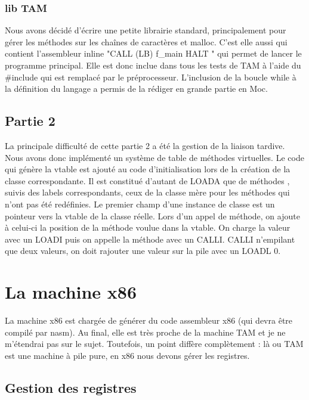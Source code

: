 \documentclass{scrartcl}
\begin{document}
\subsubsection{lib TAM}

Nous avons décidé d'écrire une petite librairie standard, principalement pour gérer les méthodes sur les
chaînes de caractères et malloc. C'est elle aussi qui contient l'assembleur inline "CALL (LB) f\_main
    HALT " qui permet de lancer le programme principal. Elle est donc inclue dans tous les tests de TAM à l'aide du \#include qui est remplacé par le préprocesseur.
L'inclusion de la boucle while à la définition du langage a permis de la rédiger en grande partie en Moc.

\subsection{Partie 2}

La principale difficulté de cette partie 2 a été la gestion de la liaison tardive.
Nous avons donc implémenté un système de table de méthodes virtuelles.
Le code qui génère la vtable est ajouté au code d'initialisation lors de la création de la classe correspondante.
Il est constitué d'autant de LOADA que de méthodes , suivis des labels correspondants, ceux de la classe mère pour 
les méthodes qui n'ont pas été redéfinies. Le premier champ d'une instance de classe est un pointeur vers la vtable de la classe réelle.
Lors d'un appel de méthode, on ajoute à celui-ci la position de la méthode voulue dans la vtable.
On charge la valeur avec un LOADI puis on appelle la méthode avec un CALLI.
CALLI n'empilant que deux valeurs, on doit rajouter une valeur sur la pile avec un LOADL 0.



\section{La machine x86}

La machine x86 est chargée de générer du code assembleur x86 (qui devra être compilé par nasm).
Au final, elle est très proche de la machine TAM et je ne m'étendrai pas sur le sujet.
Toutefois, un point diffère complètement : là ou TAM est une machine à pile pure, en x86 nous
devons gérer les registres.

\subsection{Gestion des registres}
\end{document}
